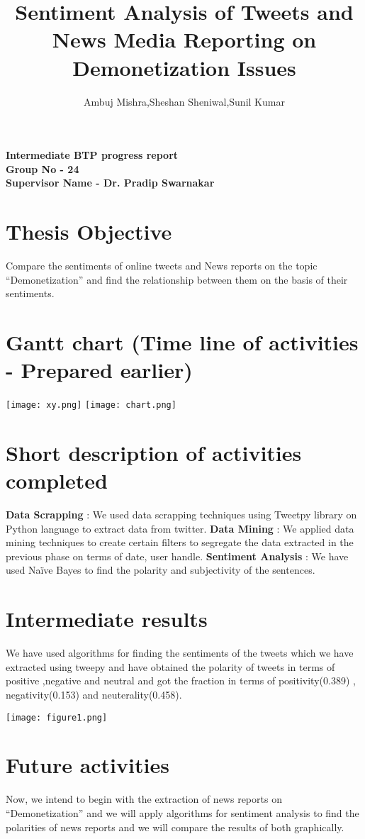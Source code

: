 \documentclass[]{article}
\title{Sentiment Analysis of Tweets and News Media Reporting on Demonetization Issues}
\author{Ambuj Mishra,Sheshan Sheniwal,Sunil Kumar}
\begin{document}
\maketitle
\begin{center}
{\large\bf
Intermediate BTP progress report \\
\vspace{2ex}
Group No   -  24\\
\vspace{2ex}
Supervisor Name - Dr. Pradip Swarnakar}  \\



\end{center}


\section{Thesis Objective}
Compare the sentiments of online tweets and News reports on the topic “Demonetization” and find the relationship between them on the basis of their sentiments.
\section{Gantt chart (Time line of activities - Prepared earlier)}
\texttt{[image: xy.png]}
\texttt{[image: chart.png]}
\section{Short description of activities completed}
{\bf Data Scrapping} : We used data scrapping techniques using Tweetpy library on Python language to extract data from twitter.
\newline
{\bf Data Mining} : We applied data mining techniques to create certain filters to segregate the data extracted in the previous phase on terms of date, user handle.
\newline
{\bf Sentiment Analysis} : We have used Naïve Bayes to find the polarity and subjectivity of the sentences.
\section{Intermediate results }
We have used algorithms for finding the sentiments of the tweets which we have extracted using tweepy and have obtained the polarity of tweets in terms of positive ,negative and neutral and got the fraction in terms of positivity(0.389) , negativity(0.153) and neuterality(0.458).
\begin{center}
\texttt{[image: figure1.png]}
\end{center}
\section{Future activities }
Now, we intend to begin with the extraction of news reports on “Demonetization” and we will apply algorithms for sentiment analysis to find the polarities of news reports and we will compare the results of both graphically.
\end{document}
